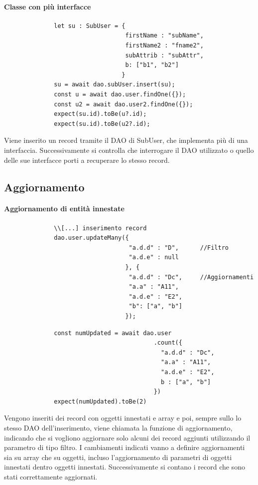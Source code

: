 \documentclass[a4paper, 12pt]{report}
\begin{document}
          \paragraph{Classe con più interfacce}
            \begin{Verbatim}
              let su : SubUser = {
                                  firstName : "subName",
                                  firstName2 : "fname2",
                                  subAttrib : "subAttr",
                                  b: ["b1", "b2"]
                                 }
              su = await dao.subUser.insert(su);
              const u = await dao.user.findOne({});
              const u2 = await dao.user2.findOne({});
              expect(su.id).toBe(u?.id);
              expect(su.id).toBe(u2?.id);
            \end{Verbatim}
            Viene inserito un record tramite il DAO di SubUser, che implementa più di una interfaccia. Successivamente si controlla che interrogare il DAO utilizzato o quello delle sue interfacce porti a recuperare lo stesso record.
        \subsection{Aggiornamento}
          \paragraph{Aggiornamento di entità innestate}
            \begin{Verbatim}
              \\[...] inserimento record
              dao.user.updateMany({
                                   "a.d.d" : "D",      //Filtro
                                   "a.d.e" : null
                                  }, {
                                   "a.d.d" : "Dc",     //Aggiornamenti
                                   "a.a" : "A11",
                                   "a.d.e" : "E2",
                                   "b": ["a", "b"]
                                  });
            \end{Verbatim}
            \begin{Verbatim}
              const numUpdated = await dao.user
                                          .count({
                                            "a.d.d" : "Dc",
                                            "a.a" : "A11",
                                            "a.d.e" : "E2",
                                            b : ["a", "b"]
                                          })
              expect(numUpdated).toBe(2)
            \end{Verbatim}
            Vengono inseriti dei record con oggetti innestati e array e poi, sempre sullo lo stesso DAO dell'inserimento, viene chiamata la funzione di aggiornamento, indicando che si vogliono aggiornare solo alcuni dei record aggiunti utilizzando il parametro di tipo filtro.
            I cambiamenti indicati vanno a definire aggiornamenti sia su array che su oggetti, incluso l'aggiornamento di parametri di oggetti innestati dentro oggetti innestati.
            Successivamente si contano i record che sono stati correttamente aggiornati.
\end{document}
